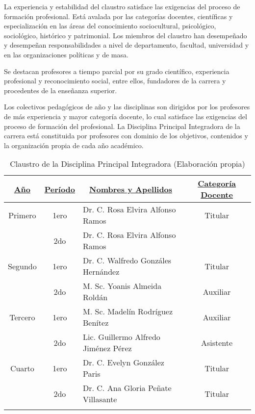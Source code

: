 La experiencia y estabilidad del claustro satisface las exigencias del proceso de formación profesional. Está avalada por las categorías docentes, científicas y especialización en las áreas del conocimiento sociocultural, psicológico, sociológico, histórico y patrimonial. Los miembros del claustro han desempeñado y desempeñan responsabilidades a nivel de departamento, facultad, universidad y en las organizaciones políticas y de masa.

Se destacan profesores a tiempo parcial por su grado científico, experiencia profesional y reconocimiento social, entre ellos, fundadores de la carrera y procedentes de la enseñanza superior.

Los colectivos pedagógicos de año y las disciplinas son dirigidos por los profesores de más experiencia y mayor categoría docente, lo cual satisface las exigencias del proceso de formación del profesional. La Disciplina Principal Integradora de la carrera está constituida por profesores con dominio de los objetivos, contenidos y la organización propia de cada año académico.  

\begin{longtable}{|c|c|p{7cm}|c|}
	
	
	
	\hline
	\underline{\textbf{Año}} &  \underline{\textbf{Período}}& \multicolumn{1}{|c|}{\underline{\textbf{Nombres y Apellidos}}} & \underline{\textbf{Categoría Docente}} \\ \hline
	
	Primero &1ero & Dr. C. Rosa Elvira Alfonso Ramos& Titular \\ \cline{2-3}
	& 2do& Dr. C. Rosa Elvira Alfonso Ramos& \\ \hline
	Segundo& 1ero& Dr. C. Walfredo Gonzáles Hernández& Titular \\ \cline{2-4}
	& 2do& M. Sc. Yoanis Almeida Roldán& Auxiliar\\ \hline
	Tercero& 1ero& M. Sc. Madelín Rodríguez Benítez& Auxiliar\\ \cline{2-4}
	& 2do& Lic. Guillermo Alfredo Jiménez Pérez& Asistente\\ \hline
	Cuarto&1ero & Dr. C. Evelyn González Paris& Titular\\ \cline{2-4}
	& 2do& Dr. C. Ana Gloria Peñate Villasante& Titular\\ \hline

	\caption{Claustro de la Disciplina Principal Integradora (Elaboración propia)}
\end{longtable}



